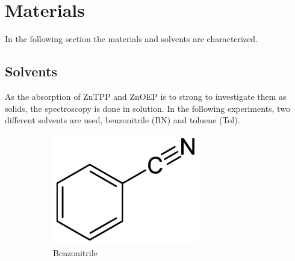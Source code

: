\section{Materials}
\label{sec:materials}

In the following section the materials and solvents are characterized. 

\subsection{Solvents}

As the absorption of ZnTPP and ZnOEP is to strong to investigate them as solids, the spectroscopy is done in solution. In the following experiments, two different solvents are used, benzonitrile (BN) and toluene (Tol). 

\begin{figure}[h]
    \centering
    \begin{subfigure}[b]{0.5\textwidth}
        \centering
        \includegraphics[width =0.7\textwidth]{Bilder/Grundlagen/Benzonitrile_structure.pdf}      
        \caption{Benzonitrile}
      \label{fig:BN}
    \end{subfigure}
    \hspace{\fill}
    \begin{subfigure}[b]{0.3\textwidth}
      \centering

\end{subfigure}
\end{figure}
